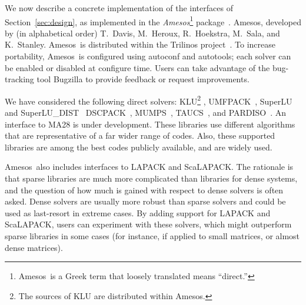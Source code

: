 \documentclass[acmtocl]{acmtrans2m}
\newcommand{\amesos}{{\sc Amesos}}
\begin{document}
We now describe a concrete implementation of the interfaces of
Section~\ref{sec:design}, as implemented in
the {\sl \amesos}\footnote{
\amesos\ is a Greek term that loosely translated means ``direct.''} package~\cite{Amesos-Reference-Guide}.
\amesos,
developed by (in alphabetical order) T.~Davis, M.~Heroux, R.~Hoekstra, 
M.~Sala, and K.~Stanley. \amesos\ is distributed within the
Trilinos project~\cite{heroux05trilinos}.
To increase portability, \amesos\ is configured using autoconf and autotools;
each solver can be enabled or disabled at configure time. Users can take
advantage of the bug-tracking tool Bugzilla to provide feedback or request
improvements.

We have considered the following direct solvers:
  KLU\footnote{The sources of KLU are
  distributed within \amesos.} \cite{davis05klu}, 
  UMFPACK~\cite{umfpack-home-page}, SuperLU and
  SuperLU\_DIST~\cite{superlu-manual}
  DSCPACK~\cite{dscpack-manual}, 
  MUMPS~\cite{mumps-manual}, 
  TAUCS~\cite{irony04parallel,rotkin04design,rozin04locality}, 
  and PARDISO~\cite{oskl:04-etna,sg:04-fgcs}. An interface to MA28 is
  under development.
These libraries use different algorithms that are
representative of a far wider range of codes. Also, these supported libraries are
among the best codes publicly available, and are widely used.  

\amesos\ also includes interfaces to LAPACK and ScaLAPACK. The rationale is
that
sparse libraries are much more complicated than libraries for dense systems,
  and the question of how much is gained with respect to dense solvers 
  is often asked. Dense
  solvers are usually more robust than sparse solvers and could be used as
  last-resort in extreme cases.  By adding support for LAPACK and ScaLAPACK, 
  users can experiment with these
  solvers, which might outperform  sparse libraries in some cases 
  (for instance, if applied to small matrices, or almost dense matrices). 
\end{document}
